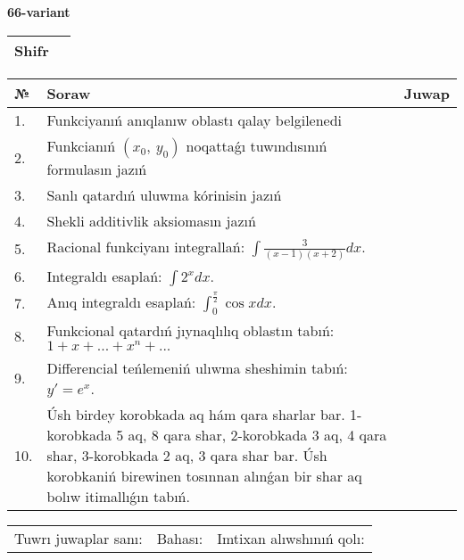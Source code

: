 \documentclass{article}
\begin{document}
  \egroup
  
  \newpage
  
  
  \textbf{66-variant}\\
  
  \bgroup
  \def\arraystretch{1.6} %
  
  \begin{tabular}{|m{5.7cm}|m{9.5cm}|}
  \hline
  Shifr & \\
  \hline
  \end{tabular}
  
  \vspace{1cm}
  
  \begin{tabular}{|m{0.7cm}|m{10cm}|m{4cm}|}
  \hline
  № & Soraw & Juwap \\
  \hline
  1. & Funkciyanıń anıqlanıw oblastı qalay belgilenedi &  \\
  \hline
  2. & Funkcianıń \((x_{0},\ y_{0})\) noqattaǵı tuwındısınıń formulasın jazıń &  \\
  \hline
  3. & Sanlı qatardıń uluwma kórinisin jazıń &  \\
  \hline
  4. & Shekli additivlik aksiomasın jazıń &  \\
  \hline
  5. & Racional funkciyanı integrallań: \(\int{\frac{3}{(x - 1)(x + 2)}dx}\). &  \\
  \hline
  6. & Integraldı esaplań: \(\int{2^{x}dx}\). &  \\
  \hline
  7. & Anıq integraldı esaplań: \(\int_{0}^{\frac{\pi}{2}}{\cos xdx}\). &  \\
  \hline
  8. & Funkcional qatardıń jıynaqlılıq oblastın tabıń:\(1 + x + ... + x^{n} + ...\) &  \\
  \hline
  9. & Differencial teńlemeniń ulıwma sheshimin tabıń: \(y' = e^{x}\). &  \\
  \hline
  10. & Úsh birdey korobkada aq hám qara sharlar bar. 1-korobkada 5 aq, 8 qara shar, 2-korobkada 3 aq, 4 qara shar, 3-korobkada 2 aq, 3 qara shar bar. Úsh korobkaniń birewinen tosınnan alınǵan bir shar aq bolıw itimallıǵın tabıń. &  \\
  \hline
  \end{tabular}
  
  \vspace{1cm}
  
  \begin{tabular}{lll}
  Tuwrı juwaplar sanı: \underline{\hspace{1.5cm}} & 
  Bahası: \underline{\hspace{1.5cm}} & 
  Imtixan alıwshınıń qolı: \underline{\hspace{2cm}} \\
  \end{tabular}
  
\end{document}
